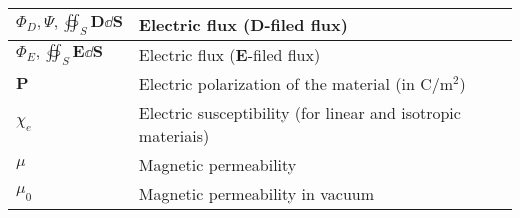 \documentclass{article}
\begin{document}
\begin{xltabular}{\textwidth}{XX}
    \(\Phi_D, \varPsi, \oiint_S \mathbf{D} \dd{\mathbf{S}}\) & Electric flux (\(\mathbf{D}\)-filed flux) \cite{wiki:D-field-flux} \\ \hline
    \(\Phi_E, \oiint_S \mathbf{E} \dd{\mathbf{S}}\) & Electric flux (\(\mathbf{E}\)-filed flux) \cite{wiki:electric-flux} \\ \hline
    \(\mathbf{P}\) & Electric polarization of the material (in \(\si{\coulomb\per\meter\squared}\))\\ \hline
    \(\chi_e\) & Electric susceptibility (for linear and isotropic materiais)\\ \hline
    \(\mu\) & Magnetic permeability \\ \hline
    \(\mu_0\) & Magnetic permeability in vacuum \\
\end{xltabular}
\end{document}
